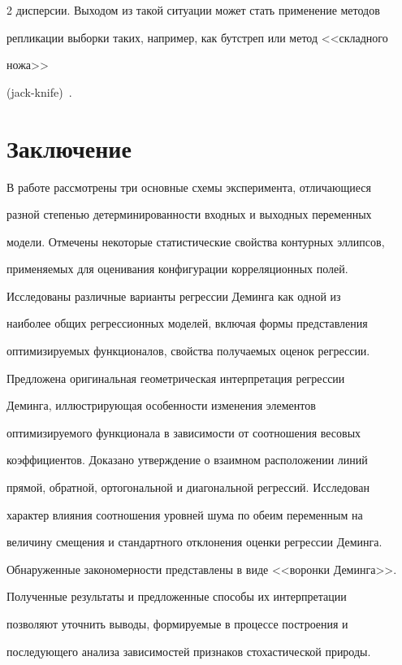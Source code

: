 \begin{multicols}{2}
дисперсии. Выходом из такой ситуации может стать применение методов

репликации выборки таких, например, как бутстреп или метод <<складного

ножа>>

  (jack-knife)~\cite{13-tim}.



\section{Заключение}



  В работе рассмотрены три основные схемы эксперимента, отличающиеся

разной степенью детерминированности входных и выходных переменных

модели. Отмечены некоторые статистические свойства контурных эллипсов,

применяемых для оценивания конфигурации корреляционных полей.



  Исследованы различные варианты регрессии Деминга как одной из

наиболее общих регрессионных моделей, включая формы представления

оптимизируемых функционалов, свойства получаемых оценок регрессии.

Предложена оригинальная геометрическая интерпретация регрессии

Деминга, иллюстрирующая особенности изменения элементов

оптимизируемого функционала в зависимости от соотношения весовых

коэффициентов. Доказано утверждение о взаимном расположении линий

прямой, обратной, ортогональной и диагональной регрессий. Исследован

характер влияния соотношения уровней шума по обеим переменным на

величину смещения и стандартного отклонения оценки регрессии Деминга.

Обнаруженные закономерности представлены в виде <<воронки Деминга>>.



  Полученные результаты и предложенные способы их интерпретации

позволяют уточнить выводы, формируемые в процессе построения и

по\-сле\-ду\-юще\-го анализа зависимостей признаков стохастической природы.




\end{multicols}
